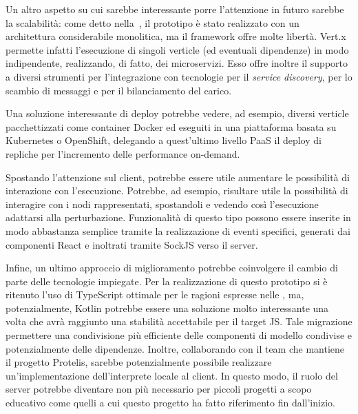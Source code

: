   Un altro aspetto su cui sarebbe interessante porre l'attenzione in futuro sarebbe la scalabilità:
  come detto nella~, il prototipo è stato realizzato con un architettura considerabile monolitica, ma il framework offre molte libertà.
  Vert.x permette infatti l'esecuzione di singoli verticle (ed eventuali dipendenze) in modo indipendente, realizzando, di fatto, dei microservizi.
  Esso offre inoltre il supporto a diversi strumenti per l'integrazione con tecnologie per il \emph{service discovery}, per lo scambio di messaggi e per il bilanciamento del carico.

  Una soluzione interessante di deploy potrebbe vedere, ad esempio, diversi verticle pacchettizzati come container Docker ed eseguiti in una piattaforma basata su Kubernetes o OpenShift,
  delegando a quest'ultimo livello PaaS il deploy di repliche per l'incremento delle performance on-demand.

  Spostando l'attenzione sul client, potrebbe essere utile aumentare le possibilità di interazione con l'esecuzione.
  Potrebbe, ad esempio, risultare utile la possibilità di interagire con i nodi rappresentati, spostandoli e vedendo così l'esecuzione adattarsi alla perturbazione.
  Funzionalità di questo tipo possono essere inserite in modo abbastanza semplice tramite la realizzazione di eventi specifici, generati dai componenti React e inoltrati tramite SockJS verso il server.

  Infine, un ultimo approccio di miglioramento potrebbe coinvolgere il cambio di parte delle tecnologie impiegate.
  Per la realizzazione di questo prototipo si è ritenuto l'uso di TypeScript ottimale per le ragioni espresse nelle ,
  ma, potenzialmente, Kotlin potrebbe essere una soluzione molto interessante una volta che avrà raggiunto una stabilità accettabile per il target JS\@.
  Tale migrazione permettere una condivisione più efficiente delle componenti di modello condivise e potenzialmente delle dipendenze.
  Inoltre, collaborando con il team che mantiene il progetto Protelis, sarebbe potenzialmente possibile realizzare un'implementazione dell'interprete locale al client.
  In questo modo, il ruolo del server potrebbe diventare non più necessario per piccoli progetti a scopo educativo come quelli a cui questo progetto ha fatto riferimento fin dall'inizio.
